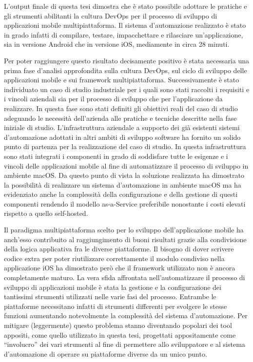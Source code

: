 
L'output finale di questa tesi dimostra che è stato possibile adottare le pratiche e gli strumenti abilitanti la cultura DevOps per il processo di sviluppo di applicazioni mobile multipiattaforma. 
Il sistema d'automazione realizzato è stato in grado infatti di compilare, 
testare, 
impacchettare e rilasciare un'applicazione, 
sia in versione Android che in versione iOS,
mediamente in circa 28 minuti.

Per poter raggiungere questo risultato decisamente positivo è stata necessaria una prima fase d'analisi approfondita sulla cultura DevOps,
sul ciclo di sviluppo delle applicazioni mobile e sui framework multipiattaforma. 
Successivamente è stato individuato un caso di studio industriale per i quali sono stati raccolti i requisiti e i vincoli aziendali sia per il processo di sviluppo che per l'applicazione da realizzare. 
In questa fase sono stati definiti gli obiettivi reali del caso di studio adeguando le necessità dell'azienda alle pratiche e tecniche descritte nella fase iniziale di studio. 
L'infrastruttura aziendale a supporto dei già esistenti sistemi d'automazione adottati in altri ambiti di sviluppo software ha fornito un solido punto di partenza per la realizzazione del caso di studio. 
In questa infrastruttura sono stati integrati i componenti in grado di soddisfare tutte le esigenze e i vincoli delle applicazioni mobile al fine di automatizzare il processo di sviluppo in ambiente macOS. 
Da questo punto di vista la soluzione realizzata ha dimostrato la possibilità di realizzare un sistema d'automazione in ambiente macOS ma ha evidenziato anche la complessità della configurazione e della gestione di questi componenti rendendo il modello as-a-Service preferibile nonostante i costi elevati rispetto a quello self-hosted.

Il paradigma multipiattaforma scelto per lo sviluppo dell'applicazione mobile ha anch'esso contribuito al raggiungimento di buoni risultati grazie alla condivisione della logica applicativa fra le diverse piattaforme. 
Il bisogno di dover scrivere codice extra per poter riutilizzare correttamente il modulo condiviso nella applicazione iOS ha dimostrato però che il framework utilizzato non è ancora completamente maturo. 
La vera sfida affrontata nell'automatizzare il processo di sviluppo di applicazioni mobile è stata la gestione e la configurazione dei tantissimi strumenti utilizzati nelle varie fasi del processo. 
Entrambe le piattaforme necessitano infatti di strumenti differenti per svolgere le stesse funzioni aumentando notevolmente la complessità del sistema d'automazione. 
Per mitigare (leggermente) questo problema stanno diventando popolari dei tool appositi, 
come quello utilizzato in questa tesi,
progettati appositamente come ``involucro'' dei vari strumenti al fine di permettere allo sviluppatore e al sistema d'automazione di operare su piattaforme diverse da un unico punto.